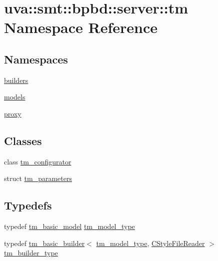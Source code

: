 \hypertarget{namespaceuva_1_1smt_1_1bpbd_1_1server_1_1tm}{}\section{uva\+:\+:smt\+:\+:bpbd\+:\+:server\+:\+:tm Namespace Reference}
\label{namespaceuva_1_1smt_1_1bpbd_1_1server_1_1tm}
\subsection*{Namespaces}
\begin{DoxyCompactItemize}
\item 
 \hyperlink{namespaceuva_1_1smt_1_1bpbd_1_1server_1_1tm_1_1builders}{builders}
\item 
 \hyperlink{namespaceuva_1_1smt_1_1bpbd_1_1server_1_1tm_1_1models}{models}
\item 
 \hyperlink{namespaceuva_1_1smt_1_1bpbd_1_1server_1_1tm_1_1proxy}{proxy}
\end{DoxyCompactItemize}
\subsection*{Classes}
\begin{DoxyCompactItemize}
\item 
class \hyperlink{classuva_1_1smt_1_1bpbd_1_1server_1_1tm_1_1tm__configurator}{tm\+\_\+configurator}
\item 
struct \hyperlink{structuva_1_1smt_1_1bpbd_1_1server_1_1tm_1_1tm__parameters}{tm\+\_\+parameters}
\end{DoxyCompactItemize}
\subsection*{Typedefs}
\begin{DoxyCompactItemize}
\item 
typedef \hyperlink{classuva_1_1smt_1_1bpbd_1_1server_1_1tm_1_1models_1_1tm__basic__model}{tm\+\_\+basic\+\_\+model} \hyperlink{namespaceuva_1_1smt_1_1bpbd_1_1server_1_1tm_a2f41d3b9fcee3dddc005fd7e7deae402}{tm\+\_\+model\+\_\+type}
\item 
typedef \hyperlink{classuva_1_1smt_1_1bpbd_1_1server_1_1tm_1_1builders_1_1tm__basic__builder}{tm\+\_\+basic\+\_\+builder}$<$ \hyperlink{namespaceuva_1_1smt_1_1bpbd_1_1server_1_1tm_a2f41d3b9fcee3dddc005fd7e7deae402}{tm\+\_\+model\+\_\+type}, \hyperlink{classuva_1_1utils_1_1file_1_1_c_style_file_reader}{C\+Style\+File\+Reader} $>$ \hyperlink{namespaceuva_1_1smt_1_1bpbd_1_1server_1_1tm_aadb8523778a8cfd88a607258658436fc}{tm\+\_\+builder\+\_\+type}
\end{DoxyCompactItemize}


